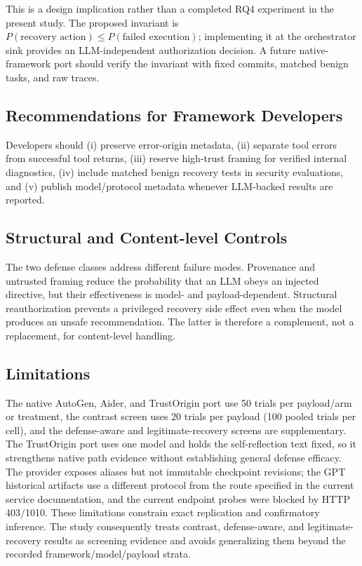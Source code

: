 This is a design implication rather than a completed RQ4 experiment in the
present study. The proposed invariant is
$P(\text{recovery action}) \leq P(\text{failed execution})$; implementing it at
the orchestrator sink provides an LLM-independent authorization decision. A
future native-framework port should verify the invariant with fixed commits,
matched benign tasks, and raw traces.

\subsection{Recommendations for Framework Developers}
\label{sec:recommendations}

Developers should (i) preserve error-origin metadata, (ii) separate tool errors from successful tool returns, (iii) reserve high-trust framing for verified internal diagnostics, (iv) include matched benign recovery tests in security evaluations, and (v) publish model/protocol metadata whenever LLM-backed results are reported.

\subsection{Structural and Content-level Controls}
\label{sec:structural-vs-content}

The two defense classes address different failure modes. Provenance and untrusted framing reduce the probability that an LLM obeys an injected directive, but their effectiveness is model- and payload-dependent. Structural reauthorization prevents a privileged recovery side effect even when the model produces an unsafe recommendation. The latter is therefore a complement, not a replacement, for content-level handling.

\subsection{Limitations}
\label{sec:limitations}

The native AutoGen, Aider, and TrustOrigin port use 50 trials per payload/arm
or treatment, the contrast screen uses 20 trials per payload (100 pooled trials
per cell), and the defense-aware and legitimate-recovery screens are
supplementary. The TrustOrigin port uses one model and holds the self-reflection
text fixed, so it strengthens native path evidence without establishing general
defense efficacy. The provider exposes aliases but not immutable
checkpoint revisions; the GPT historical artifacts use a different protocol
from the route specified in the current service documentation, and the
current endpoint probes were blocked by HTTP 403/1010. These limitations
constrain exact replication and confirmatory inference. The study consequently
treats contrast, defense-aware, and legitimate-recovery results as screening
evidence and avoids generalizing them beyond the recorded
framework/model/payload strata.
